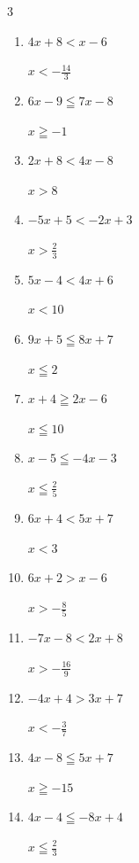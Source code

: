 \begin{multicols}{3}
\begin{enumerate}
        $\displaystyle x\leqq 6$

  \item $4x+8<x-6$

        $\displaystyle x<-\frac{14}{3}$

  \item $6x-9\leqq 7x-8$

        $\displaystyle x\geqq -1$

  \item $2x+8<4x-8$

        $\displaystyle x>8$

  \item $-5x+5<-2x+3$

        $\displaystyle x>\frac{2}{3}$

  \item $5x-4<4x+6$

        $\displaystyle x<10$

  \item $9x+5\leqq 8x+7$

        $\displaystyle x\leqq 2$

  \item $x+4\geqq 2x-6$

        $\displaystyle x\leqq 10$

  \item $x-5\leqq -4x-3$

        $\displaystyle x\leqq \frac{2}{5}$

  \item $6x+4<5x+7$

        $\displaystyle x<3$

  \item $6x+2>x-6$

        $\displaystyle x>-\frac{8}{5}$

  \item $-7x-8<2x+8$

        $\displaystyle x>-\frac{16}{9}$

\columnbreak %

  \item $-4x+4>3x+7$

        $\displaystyle x<-\frac{3}{7}$

  \item $4x-8\leqq 5x+7$

        $\displaystyle x\geqq -15$

  \item $4x-4\leqq -8x+4$

        $\displaystyle x\leqq \frac{2}{3}$


\end{enumerate}
\end{multicols}
